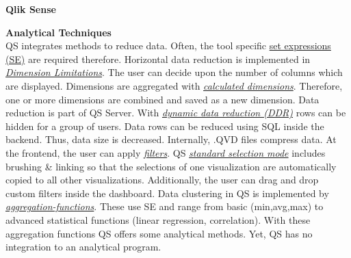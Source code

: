 \noindent \textbf{Qlik Sense}
\par
\textbf{Analytical Techniques}\\
QS integrates methods to reduce data. Often, the tool specific \href{https://help.qlik.com/en-US/sense/3.2/Subsystems/Hub/Content/ChartFunctions/SetAnalysis/set-analysis-expressions.htm}{set expressions  (SE)} are required therefore. 
Horizontal data reduction is implemented in \href{https://help.qlik.com/en-US/sense/3.2/Content/Videos/Videos-dimensions-limitations.htm}{\textit{Dimension Limitations}}. The user can decide upon the number of columns which are displayed. 
Dimensions are aggregated with \href{https://help.qlik.com/en-US/sense/3.2/Subsystems/Hub/Content/Dimensions/calculated-dimensions.htm}{\textit{calculated dimensions}}. Therefore, one or more dimensions are combined and saved as a new dimension.
Data reduction is part of QS Server. With \href{https://help.qlik.com/en-US/sense/2.1/Subsystems/Hub/Content/Scripting/Security/dynamic-data-reduction.htm}{\textit{dynamic data reduction  (DDR)}} rows can be hidden for a group of users. Data rows can be reduced using SQL inside the backend. Thus, data size is decreased. Internally, .QVD files compress data. 
At the frontend, the user can apply \href{https://help.qlik.com/en-US/sense/2.1/Subsystems/Hub/Content/Visualizations/FilterPane/filter-pane.htm}{\textit{filters}}. QS \href{https://help.qlik.com/en-US/sense/2.1/Content/Videos/Videos-assoc-selection-model.htm}{\textit{standard selection mode}} includes brushing \& linking so that the selections of one visualization are automatically copied to all other visualizations. Additionally, the user can drag and drop custom filters inside the dashboard. 
Data clustering in QS is implemented by \href{https://help.qlik.com/en-US/sense/3.2/Subsystems/Hub/Content/Scripting/AggregationFunctions/aggregation-functions.htm}{\textit{aggregation-functions}}. These use SE and range from basic  (min,avg,max) to advanced statistical functions (linear regression, correlation). With these aggregation functions QS offers some analytical methods. Yet, QS has no integration to an analytical program.
\par

